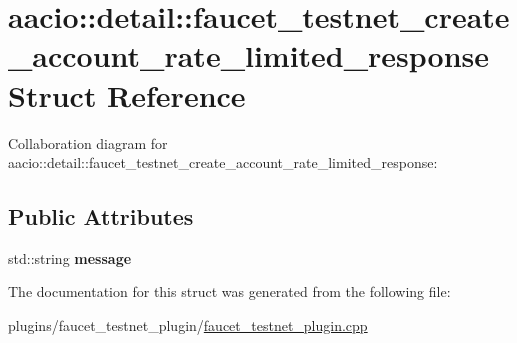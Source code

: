 \hypertarget{structaacio_1_1detail_1_1faucet__testnet__create__account__rate__limited__response}{}\section{aacio\+:\+:detail\+:\+:faucet\+\_\+testnet\+\_\+create\+\_\+account\+\_\+rate\+\_\+limited\+\_\+response Struct Reference}
\label{structaacio_1_1detail_1_1faucet__testnet__create__account__rate__limited__response}


Collaboration diagram for aacio\+:\+:detail\+:\+:faucet\+\_\+testnet\+\_\+create\+\_\+account\+\_\+rate\+\_\+limited\+\_\+response\+:
\subsection*{Public Attributes}
\begin{DoxyCompactItemize}
\item 
\mbox{\label{structaacio_1_1detail_1_1faucet__testnet__create__account__rate__limited__response_a9459b43dcaff38d2ad6aa33092618ff8}} 
std\+::string {\bfseries message}
\end{DoxyCompactItemize}


The documentation for this struct was generated from the following file\+:\begin{DoxyCompactItemize}
\item 
plugins/faucet\+\_\+testnet\+\_\+plugin/\mbox{\hyperlink{faucet__testnet__plugin_8cpp}{faucet\+\_\+testnet\+\_\+plugin.\+cpp}}\end{DoxyCompactItemize}
